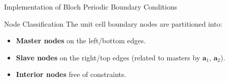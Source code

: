 \documentclass[svgnames, aspectratio = 1610]{beamer}
\begin{document}
\begin{frame}{Implementation of Bloch Periodic Boundary Conditions}
  \begin{block}{Node Classification}
    The unit cell boundary nodes are partitioned into:
    \pause
    \begin{itemize}[<+->]
      \item \textbf{Master nodes} on the left/bottom edges.
      \item \textbf{Slave nodes} on the right/top edges
      (related to masters by $\bm a_1$, $\bm a_2$).
      \item \textbf{Interior nodes} free of constraints.
    \end{itemize}
  \end{block}
\end{frame}
\end{document}
